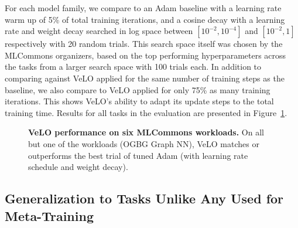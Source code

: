 \documentclass[11pt]{article}
\begin{document}
For each model family, we compare to an Adam baseline with a learning rate warm up of 5\% of total training iterations, 
and a cosine decay with a learning rate and weight decay searched in log space between $[10^{-2}, 10^{-4}]$ and $[10^{-2}, 1]$ respectively with 20 random trials. 
This search space itself was chosen by the MLCommons organizers, 
based on the top performing hyperparameters across the tasks from a larger search space with 100 trials each. 
In addition to comparing against VeLO applied for the same number of training steps as the baseline, we also compare to VeLO applied for only 75\% as many training iterations.
This shows VeLO's ability to adapt its update steps to the total training time.
Results for all tasks in the evaluation are presented in Figure~\ref{fig:init2winit_train}.

\begin{figure}
    \centering
    \caption{\textbf{VeLO performance on six MLCommons workloads.} On all but one of the workloads (OGBG Graph NN), VeLO matches or outperforms the best trial of tuned Adam (with learning rate schedule and weight decay).
    \label{fig:init2winit_train}
    }
\end{figure}

\subsection{Generalization to Tasks Unlike Any Used for Meta-Training} 
\end{document}
